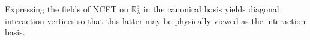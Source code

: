 \documentclass[a4paper,11pt]{article}
\numberwithin{equation}{section}
\newcommand\Rl{\mathbb{R}^3_\lambda}
\theoremstyle{nonumberplain}
\begin{document}

Expressing the fields of NCFT on $\Rl$ in the canonical basis yields diagonal interaction vertices so that this latter may be physically viewed as the interaction basis.
\end{document}
